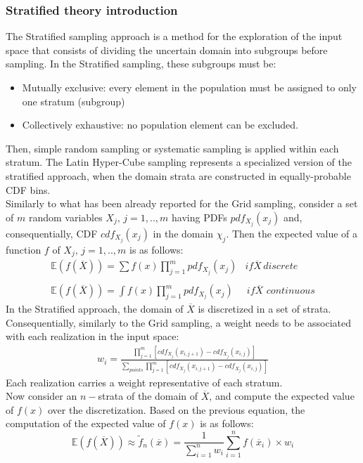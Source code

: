 \subsubsection{Stratified theory introduction}
\label{subsub:Stratifiedtheory}
The Stratified sampling approach is a method for the exploration of the input space that consists of dividing the uncertain domain into subgroups before sampling. In the Stratified sampling, these subgroups must be:
\begin{itemize}
  \item Mutually exclusive: every element in the population must be assigned to only one stratum (subgroup)
  \item Collectively exhaustive: no population element can be excluded.
\end{itemize}
Then, simple random sampling or systematic sampling is applied within each stratum. The Latin Hyper-Cube sampling represents a specialized version of the stratified approach, when the domain strata are constructed in equally-probable CDF bins.
\\Similarly to what has been already reported for the Grid sampling, consider a set of  $m$ random variables $X_{j}, \, j=1,..,m$ having PDFs $pdf_{X_{j}}(x_{j})$ and, consequentially, CDF $cdf_{X_{j}}(x_{j})$ in the domain $\chi_{j}$. Then the expected value of a function $f$ of $X_{j}, \, j=1,..,m$ is as follows:
\begin{equation}
\begin{matrix}
\mathbb{E}(f(\overline{X})) =\sum f(x)   \prod_{j=1}^{m} pdf_{X_{j}}(x_{j}) & if \overline{X} \, discrete \\
\\
\mathbb{E}(f(\overline{X})) =\int f(x)\prod_{j=1}^{m} pdf_{X_{j}}(x_{j}) & \, if \overline{X} \, \, continuous
\end{matrix}
\end{equation}
In the Stratified approach, the domain of $\overline{X}$ is discretized in a set of strata. Consequentially, similarly to the Grid sampling, a weight needs to be associated with each realization in the input space:
\begin{equation}
\begin{matrix}
  w_{i}= \frac{\prod_{j=1}^{m} \left [  cdf_{X_{j}}(x_{i,j+1}) - cdf_{X_{j}}(x_{i,j}) \right ]}{\sum_{points}\prod_{j=1}^{m} \left [  cdf_{X_{j}}(x_{i,j+1}) - cdf_{X_{j}}(x_{i,j}) \right ]}
\end{matrix}
\end{equation}
Each realization carries a weight representative of each stratum.
\\Now consider
an $n-$strata of the domain of  $\overline{X}$, and compute the expected value of $f(x)$ over the discretization. Based on the previous equation, the computation of the expected value of $f(x)$ is as follows:
\begin{equation}
 \mathbb{E}(f(\overline{X})) \approx   \widetilde{f}_{n}(\overline{x}) = \frac{1}{\sum_{i=1}^{n}w_{i}} \sum_{i=1}^{n} f(\overline{x}_{i}) \times w_{i}
\end{equation}
